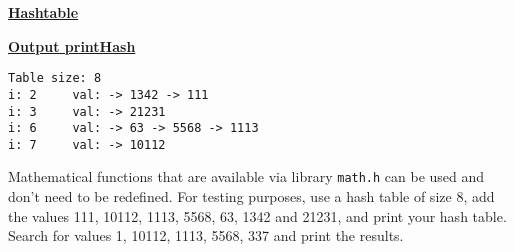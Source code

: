 \documentclass[a4paper]{article}
\begin{document}
\begin{center}
\begin{minipage}[t]{0.2\textwidth}
\centering
\underline{\textbf{Hashtable}}

\end{minipage}
%
\hspace{2.5cm}
\begin{minipage}[t]{0.5\textwidth}
\underline{\textbf{Output printHash}}		
\begin{verbatim}
Table size: 8
i: 2     val: -> 1342 -> 111
i: 3     val: -> 21231
i: 6     val: -> 63 -> 5568 -> 1113
i: 7     val: -> 10112
\end{verbatim}
\end{minipage}
\end{center}

Mathematical functions that are available via library
\lstinline!math.h! can be used and don't need to be redefined.  For
testing purposes, use a hash table of size 8, add the values 111,
10112, 1113, 5568, 63, 1342 and 21231, and print your hash table.
Search for values 1, 10112, 1113, 5568, 337 and print the results.
\end{document}
